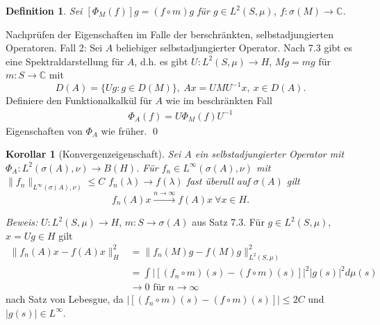 \documentclass[12pt]{extreport} %
\newtheorem{Definition}[Satz]{Definition}
\newtheorem{Korollar}[Satz]{Korollar}
\numberwithin{equation}{section}
\newcommand{\C}{\mathbb{C}} %
\newcommand{\Bew}{\emph{Beweis: }}
\begin{document}
	\begin{Definition}
		Sei $[\Phi_M(f)]g = (f\circ m)g$ für $g\in L^2(S,\mu)$, $f\colon \sigma(M)\rightarrow \C$. 
	\end{Definition}
	
	Nachprüfen der Eigenschaften im Falle der berschränkten, selbstadjungierten Operatoren. Fall 2: Sei $A$ beliebiger selbstadjungierter Operator. Nach 7.3 gibt es eine Spektraldarstellung für $A$, d.h. es gibt $U\colon L^2(S,\mu)\rightarrow H$, $Mg=mg$ für $m\colon S\rightarrow \C$ mit 
	$$D(A) = \{Ug\colon g\in D(M) \},~ Ax = UMU^{-1}x, ~x\in D(A).$$
	Definiere den Funktionalkalkül für $A$ wie im beschränkten Fall
	\begin{align*}
		\Phi_A(f) = U\Phi_M(f)U^{-1}
	\end{align*}
	Eigenschaften von $\Phi_A$ wie früher.
	\qed
	
	\begin{Korollar}[Konvergenzeigenschaft]
		Sei $A$ ein selbstadjungierter Operator mit $\Phi_A\colon L^2(\sigma(A), \nu) \rightarrow B(H)$. Für $f_n\in L^\infty(\sigma(A),\nu)$ mit $\|f_n\|_{L^\infty(\sigma(A),\nu)}\leq C$ $f_n(\lambda)\rightarrow f(\lambda)$ fast überall auf $\sigma(A)$ gilt
		$$f_n(A)x\overset{n\rightarrow \infty}{\longrightarrow} f(A)x ~\forall x\in H.$$
	\end{Korollar}
	
	\Bew $U\colon L^2(S,\mu)\rightarrow H$, $m\colon S\rightarrow \sigma(A)$ aus Satz 7.3. Für $g\in L^2(S,\mu)$, $x = Ug\in H$ gilt
	\begin{align*}
		\|f_n(A)x-f(A)x\|_H^2 &= \|f_n(M)g - f(M)g\|_{L^2(S,\mu)}^2\\
		&= \int |[(f_n\circ m)(s) - (f\circ m)(s)]|^2 |g(s)|^2 d\mu(s)\\
		&\rightarrow 0 \text{ für }n\rightarrow \infty
	\end{align*}
	nach Satz von Lebesgue, da $|[(f_n\circ m)(s) - (f\circ m)(s)]|\leq 2C$ und $|g(s)|\in L^\infty$.
	
\end{document}
